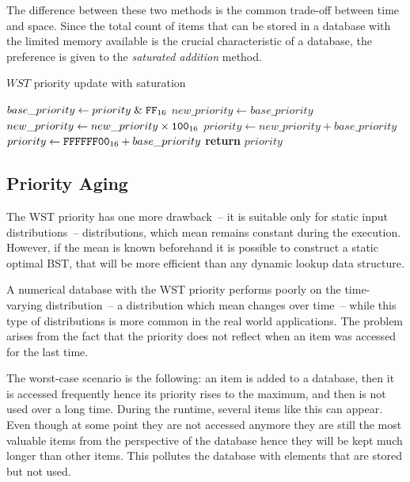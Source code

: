 The difference between these two methods is the common trade-off between time and space. Since the total count of items that can be stored in a database with the limited memory available is the crucial characteristic of a database, the preference is given to the \emph{saturated addition} method.
\begin{algorithm}[t]
\caption{$WST$ priority update with saturation}\label{alg:wst_priority2}
\begin{algorithmic}[1]
    \State $base\_priority\gets priority \mathrel{\&} \texttt{FF}_{16}$
    \State $new\_priority\gets base\_priority$
    \State $new\_priority \gets new\_priority \times \texttt{100}_{16}$
    \State{}
      \State $priority \gets new\_priority + base\_priority$
    \Else
      \State $priority \gets \texttt{FFFFFF00}_{16} + base\_priority$
    \EndIf
    \State \textbf{return} $priority$
  \EndProcedure
\end{algorithmic}
\end{algorithm}

\subsection{Priority Aging}
\label{sssec:priority_aging}
The WST priority has one more drawback~-- it is suitable only for static input distributions~-- distributions, which mean remains constant during the execution. However, if the mean is known beforehand it is possible to construct a static optimal BST\cite[p.~442]{knuth3}, that will be more efficient than any dynamic lookup data structure.

A numerical database with the WST priority performs poorly on the time-varying distribution~-- a distribution which mean changes over time~-- while this type of distributions is more common in the real world applications. The problem arises from the fact that the priority does not reflect when an item was accessed for the last time.

The worst-case scenario is the following: an item is added to a database, then it is accessed frequently hence its priority rises to the maximum, and then is not used over a long time. During the runtime, several items like this can appear. Even though at some point they are not accessed anymore they are still the most valuable items from the perspective of the database hence they will be kept much longer than other items. This pollutes the database with elements that are stored but not used.

